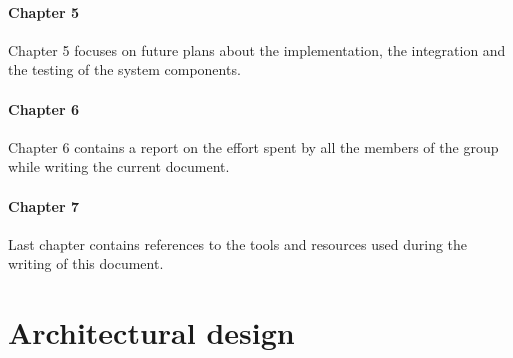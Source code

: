 \documentclass[a4paper,oneside,11pt]{book}
\begin{document}
    \subsubsection{Chapter 5}
    Chapter 5 focuses on future plans about the implementation, the integration and the testing of the system components.
    \subsubsection{Chapter 6}
    Chapter 6 contains a report on the effort spent by all the members of the group while writing the current document.
    \subsubsection{Chapter 7}
    Last chapter contains references to the tools and resources used during the writing of this document.

\chapter{Architectural design}
\end{document}
